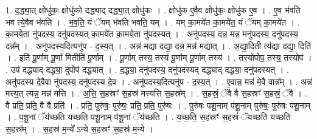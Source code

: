 \documentclass[17pt]{extarticle}
\begin{document}
1. द॒द्ध्या॒त् क्षोधु॑कः॒ क्षोधु॑को दद्ध्याद् दद्ध्या॒त् क्षोधु॑कः । . क्षोधु॑क ए॒वैव क्षोधु॑कः॒ क्षोधु॑क ए॒व । . ए॒व भ॑वति भव त्ये॒वैव भ॑वति । . भ॒व॒ति॒ यं ॅयम् भ॑वति भवति॒ यम् । . यम् का॒मये॑त का॒मये॑त॒ यं ॅयम् का॒मये॑त । . का॒मये॒ता नु॑पदस्य॒ दनु॑पदस्यत् का॒मये॑त का॒मये॒ता नु॑पदस्यत् । . अनु॑पदस्य॒ दन्न॒ मन्न॒ मनु॑पदस्य॒ दनु॑पदस्य॒ दन्न᳚म् । . अनु॑पदस्य॒दित्यनु॑प - द॒स्य॒त् । . अन्न॑ मद्या दद्या॒ दन्न॒ मन्न॑ मद्यात् । . अ॒द्या॒दिती त्य॑द्या दद्या॒ दिति॑ । . इति॑ पू॒र्णाम् पू॒र्णा मितीति॑ पू॒र्णाम् । . पू॒र्णाम् तस्य॒ तस्य॑ पू॒र्णाम् पू॒र्णाम् तस्य॑ । . तस्योपोप॒ तस्य॒ तस्योप॑ । . उप॑ दद्ध्याद् दद्ध्या॒ दुपोप॑ दद्ध्यात् । . द॒द्ध्या॒ दनु॑पदस्य॒ दनु॑पदस्यद् दद्ध्याद् दद्ध्या॒ दनु॑पदस्यत् । . अनु॑पदस्य दे॒वैवा नु॑पदस्य॒ दनु॑पदस्य दे॒व । . अनु॑पदस्य॒दित्यनु॑प - द॒स्य॒त् । . ए॒वान्न॒ मन्न॑ मे॒वै वान्न᳚म् । . अन्न॑ मत्त्य॒त् त्यन्न॒ मन्न॑ मत्ति । . अ॒त्ति॒ स॒हस्रꣳ॑ स॒हस्र॑ मत्त्यत्ति स॒हस्र᳚म् । . स॒हस्रं॒ ॅवै वै स॒हस्रꣳ॑ स॒हस्रं॒ ॅवै । . वै प्रति॒ प्रति॒ वै वै प्रति॑ । . प्रति॒ पुरु॑षः॒ पुरु॑षः॒ प्रति॒ प्रति॒ पुरु॑षः । . पुरु॑षः पशू॒नाम् प॑शू॒नाम् पुरु॑षः॒ पुरु॑षः पशू॒नाम् । . प॒शू॒नां ॅय॑च्छति यच्छति पशू॒नाम् प॑शू॒नां ॅय॑च्छति । . य॒च्छ॒ति॒ स॒हस्रꣳ॑ स॒हस्रं॑ ॅयच्छति यच्छति स॒हस्र᳚म् । . स॒हस्र॑ म॒न्ये᳚ ऽन्ये स॒हस्रꣳ॑ स॒हस्र॑ म॒न्ये । \newline
\end{document}
